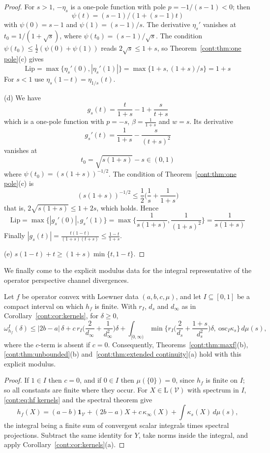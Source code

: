 \begin{proof}
For $s>1$, $-\eta_s$ is a one-pole function with pole $p=-1/(s-1)<0$; then \[\psi(t)=(s-1)/(1+(s-1)t)\] with $\psi(0)=s-1$ and $\psi(1)=(s-1)/s$. The derivative $\eta_s'$ vanishes at $t_0=1/(1+\sqrt s)$, where $\psi(t_0)=(s-1)/\sqrt s$. The condition $\psi(t_0)\leq\frac12(\psi(0)+\psi(1))$ reads $2\sqrt s\leq1+s$, so Theorem~\ref{cont:thm:one pole}(c) gives \[\mathrm{Lip}=\max\{\eta_s'(0),|\eta_s'(1)|\}=\max\{1+s,(1+s)/s\}=1+s\] For $s<1$ use $\eta_s(1-t)=\eta_{1/s}(t)$.
 
(d) We have \[g_s(t)=\frac{t}{1+s}-1+\frac{s}{t+s}\] which is a one-pole function with $p=-s$, $\beta=\frac1{1+s}$ and $w=s$. Its derivative \[g_s'(t)=\frac1{1+s}-\frac{s}{(t+s)^2}\] vanishes at \[t_0=\sqrt{s(1+s)}-s\in(0,1)\] where $\psi(t_0)=(s(1+s))^{-1/2}$. The condition of Theorem~\ref{cont:thm:one pole}(c) is \[(s(1+s))^{-1/2}\leq\frac12\big(\frac1s+\frac1{1+s}\big)\] that is, $2\sqrt{s(1+s)}\leq1+2s$, which holds. Hence \[\mathrm{Lip}=\max\{|g_s'(0)|,g_s'(1)\}=\max\{\frac1{s(1+s)},\frac1{(1+s)^2}\}=\frac1{s(1+s)}\] Finally $|g_s(t)|=\frac{t(1-t)}{(1+s)(t+s)}\leq\frac{1-t}{1+s}$.
 
(e) $s(1-t)+t\geq(1+s)\min\{t,1-t\}$.
\end{proof}
 We finally come to the explicit modulus data for the integral representative of the operator perspective channel divergences. 
\begin{theorem}\label{cont:thm:integral modulus}
Let $f$ be operator convex with Loewner data $(a,b,c,\mu)$, and let $I\subseteq[0,1]$ be a compact interval on which $h_f$ is finite. With $r_I$, $d_s$ and $d_\infty$ as in Corollary~\ref{cont:cor:kernels}, for $\delta\geq0$,
\[
\omega^I_{h_f}(\delta)\leq|2b-a|\,\delta+c\,r_I\Big(\frac{2}{d_\infty}+\frac{1}{d_\infty^2}\Big)\delta+\int_{[0,\infty)}\min\Big\{r_I\Big(\frac{2}{d_s}+\frac{1+s}{d_s^2}\Big)\delta,\ \mathrm{osc}_I\kappa_s\Big\}\,d\mu(s),
\]
where the $c$-term is absent if $c=0$. Consequently, Theorems~\ref{cont:thm:maxf}(b), \ref{cont:thm:unbounded}(b) and~\ref{cont:thm:extended continuity}(a) hold with this explicit modulus.
\end{theorem}
 
\begin{proof}
If $1\in I$ then $c=0$, and if $0\in I$ then $\mu(\{0\})=0$, since $h_f$ is finite on $I$; so all constants are finite where they occur. For $X\in\mathrm{L}(\mathcal{V})$ with spectrum in $I$, \eqref{cont:eq:hf kernels} and the spectral theorem give
\[
h_f(X)=(a-b)\mathbf{1}_{\mathcal{V}}+(2b-a)X+c\,\kappa_\infty(X)+\int\kappa_s(X)\,d\mu(s),
\]
the integral being a finite sum of convergent scalar integrals times spectral projections. Subtract the same identity for $Y$, take norms inside the integral, and apply Corollary~\ref{cont:cor:kernels}(a).
\end{proof}
 
